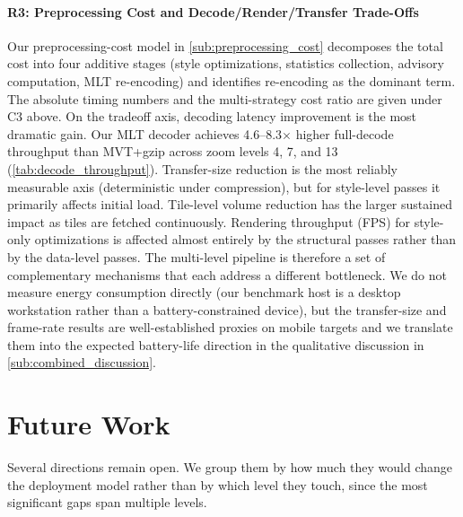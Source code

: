 \paragraph{R3: Preprocessing Cost and Decode/Render/Transfer Trade-Offs}
Our preprocessing-cost model in \cref{sub:preprocessing_cost} decomposes the total cost into four additive stages (style optimizations, statistics collection, advisory computation, \ac{MLT} re-encoding) and identifies re-encoding as the dominant term.
The absolute timing numbers and the multi-strategy cost ratio are given under C3 above.
On the tradeoff axis, decoding latency improvement is the most dramatic gain.
Our \ac{MLT} decoder achieves \numrange{4.6}{8.3}$\times$ higher full-decode throughput than \ac{MVT}+gzip across zoom levels 4, 7, and 13 (\cref{tab:decode_throughput}).
Transfer-size reduction is the most reliably measurable axis (deterministic under compression), but for style-level passes it primarily affects initial load.
Tile-level volume reduction has the larger sustained impact as tiles are fetched continuously.
Rendering throughput (\ac{FPS}) for style-only optimizations is affected almost entirely by the structural passes rather than by the data-level passes.
The multi-level pipeline is therefore a set of complementary mechanisms that each address a different bottleneck.
We do not measure energy consumption directly (our benchmark host is a desktop workstation rather than a battery-constrained device), but the transfer-size and frame-rate results are well-established proxies on mobile targets and we translate them into the expected battery-life direction in the qualitative discussion in \cref{sub:combined_discussion}.

\section{Future Work}\label{sec:conclusion_future_work}

Several directions remain open.
We group them by how much they would change the deployment model rather than by which level they touch, since the most significant gaps span multiple levels.

